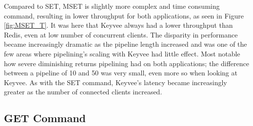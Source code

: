 \documentclass[english,10pt,twocolumn]{article}
\begin{document}
Compared to SET, MSET is slightly more complex and time consuming command, resulting in lower throughput for both applications, as seen in Figure \ref{fig:MSET_T}.
It was here that Keyvee always had a lower throughput than Redis, even at low number of concurrent clients. 
The disparity in performance became increasingly dramatic as the pipeline length increased and was one of the few areas where pipelining's scaling with Keyvee had little effect.
Most notable how severe diminishing returns pipelining had on both applications; the difference between a pipeline of 10 and 50 was very small, even more so when looking at Keyvee.
As with the SET command, Keyvee's latency became increasingly greater as the number of connected clients increased.

\subsection{GET Command}
\end{document}

